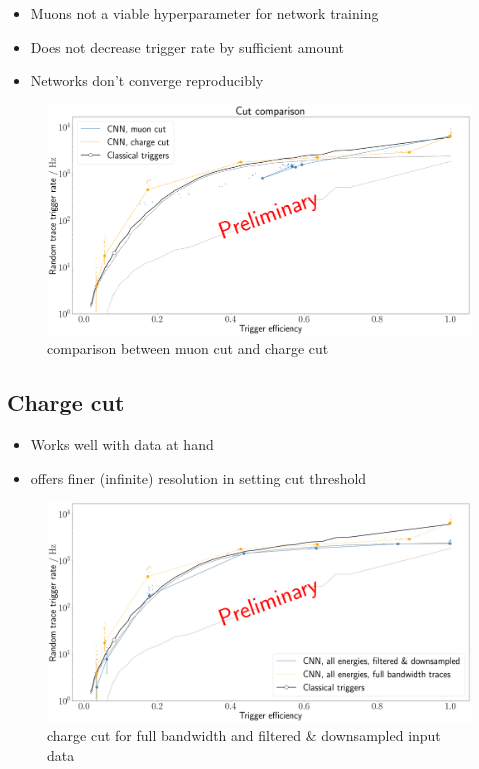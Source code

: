 \begin{itemize}
	\item Muons not a viable hyperparameter for network training
	\item Does not decrease trigger rate by sufficient amount
	\item Networks don't converge reproducibly
\end{itemize}

\begin{figure}
	\centering
	\includegraphics[width=1\textwidth]{./plots/prelim/cut_comparison.png}
	\caption{comparison between muon cut and charge cut}
\end{figure}

\subsection{Charge cut}
\label{ssec:cnn-charge-cut}

\begin{itemize}
	\item Works well with data at hand
	\item offers finer (infinite) resolution in setting cut threshold
\end{itemize}

\begin{figure}
	\centering
	\includegraphics[width=1\textwidth]{./plots/prelim/charge_cut.png}
	\caption{charge cut for full bandwidth and filtered \& downsampled input data}
\end{figure}

